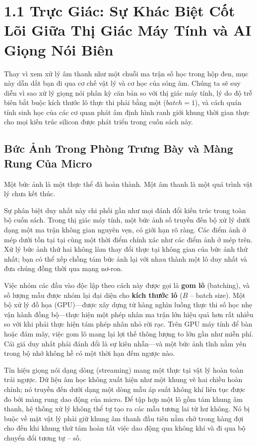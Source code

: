 \documentclass[11pt,a4paper]{article}
\begin{document}
\section*{1.1 Trực Giác: Sự Khác Biệt Cốt Lõi Giữa Thị Giác Máy Tính và AI Giọng Nói Biên}

\begin{learningobj}
Thay vì xem xử lý âm thanh như một chuỗi ma trận số học trong hộp đen, mục này dẫn dắt bạn đi qua cơ chế vật lý và cơ học của sóng âm. Chúng ta sẽ suy diễn vì sao xử lý giọng nói phân kỳ căn bản so với thị giác máy tính, lý do độ trễ biên bắt buộc kích thước lô thực thi phải bằng một ($batch=1$), và cách quán tính sinh học của các cơ quan phát âm định hình ranh giới khung thời gian thực cho mọi kiến trúc silicon được phát triển trong cuốn sách này.
\end{learningobj}

\subsection*{Bức Ảnh Trong Phòng Trưng Bày và Màng Rung Của Micro}

Một bức ảnh là một thực thể đã hoàn thành. Một âm thanh là một quá trình vật lý chưa kết thúc.

Sự phân biệt duy nhất này chi phối gần như mọi đánh đổi kiến trúc trong toàn bộ cuốn sách. Trong thị giác máy tính, một bức ảnh số truyền đến bộ xử lý dưới dạng một ma trận không gian nguyên vẹn, có giới hạn rõ ràng. Các điểm ảnh ở mép dưới tồn tại tại cùng một thời điểm chính xác như các điểm ảnh ở mép trên. Xử lý bức ảnh thứ hai không làm thay đổi thực tại không gian của bức ảnh thứ nhất; bạn có thể xếp chồng tám bức ảnh lại với nhau thành một lô duy nhất và đưa chúng đồng thời qua mạng nơ-ron.

Việc nhóm các đầu vào độc lập theo cách này được gọi là \textbf{gom lô} (batching), và số lượng mẫu được nhóm lại đại diện cho \textbf{kích thước lô} ($B$ -- batch size). Một bộ xử lý đồ họa (GPU)---được xây dựng từ hàng nghìn luồng thực thi số học nhẹ vận hành đồng bộ---thực hiện một phép nhân ma trận lớn hiệu quả hơn rất nhiều so với khi phải thực hiện tám phép nhân nhỏ rời rạc. Trên GPU máy tính để bàn hoặc đám mây, việc gom lô mang lại lợi thế thông lượng to lớn gần như miễn phí. Cái giá duy nhất phải đánh đổi là sự kiên nhẫn---và một bức ảnh tĩnh nằm yên trong bộ nhớ không hề có một thời hạn đếm ngược nào.

Tín hiệu giọng nói dạng dòng (streaming) mang một thực tại vật lý hoàn toàn trái ngược. Dữ liệu âm học không xuất hiện như một khung vẽ hai chiều hoàn chỉnh; nó truyền đến dưới dạng một dòng mẫu áp suất không khí liên tục được đo bởi màng rung dao động của micro. Để tập hợp một lô gồm tám khung âm thanh, hệ thống xử lý không thể tự tạo ra các mẫu tương lai từ hư không. Nó bị buộc về mặt vật lý phải giữ khung âm thanh đầu tiên nằm chờ trong hàng đợi cho đến khi khung thứ tám hoàn tất việc dao động qua không khí và đi qua bộ chuyển đổi tương tự -- số.
\end{document}
